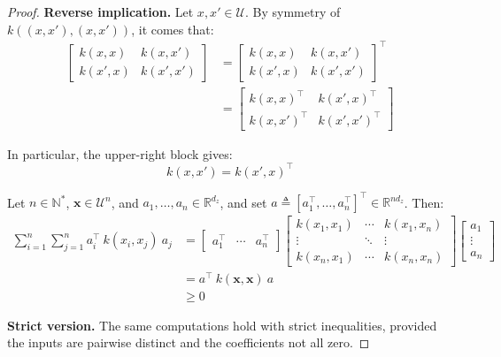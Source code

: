 \begin{proof}
	\textbf{Reverse implication.} Let $x,x'\in\mathcal{U}$. By symmetry of $k((x,x'),(x,x'))$, it comes that:
	\begin{equation}
		\begin{aligned}
		\begin{bmatrix}
		k(x,x)&k(x,x')\\k(x',x)&k(x',x')
		\end{bmatrix}&=\begin{bmatrix}
		k(x,x)&k(x,x')\\k(x',x)&k(x',x')
		\end{bmatrix}^\top\\
		&=\begin{bmatrix}
		k(x,x)^\top&k(x',x)^\top\\k(x,x')^\top&k(x',x')^\top
		\end{bmatrix}
		\end{aligned}
	\end{equation}

	In particular, the upper-right block gives:
	\begin{equation}
		k(x,x')=k(x',x)^\top
	\end{equation}

	Let $n\in\mathbb{N}^*$, $\mathbf{x}\in\mathcal{U}^n$, and $a_1,\dots,a_n\in\mathbb{R}^{d_z}$, and set $a\triangleq[a_1^\top,\dots,a_n^\top]^\top\in\mathbb{R}^{nd_z}$. Then:
	\begin{equation}
		\begin{aligned}
		\sum_{i=1}^n\sum_{j=1}^na_i^\top\:k(x_i,x_j)\:a_j&=\begin{bmatrix}a_1^\top&\cdots&a_n^\top\end{bmatrix}\begin{bmatrix}k(x_1,x_1)&\cdots&k(x_1,x_n)\\\vdots&\ddots&\vdots\\k(x_n,x_1)&\cdots&k(x_n,x_n)\end{bmatrix}\begin{bmatrix}a_1\\\vdots\\a_n\end{bmatrix}\\
		&=a^\top\:k(\mathbf{x},\mathbf{x})\:a\\
		&\geq0
		\end{aligned}
	\end{equation}

	\textbf{Strict version.} The same computations hold with strict inequalities, provided the inputs are pairwise distinct and the coefficients not all zero.
\end{proof}

